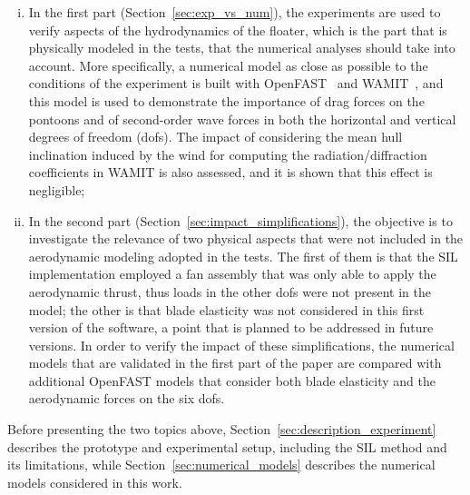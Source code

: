 \begin{enumerate}[i.]
    \item In the first part (Section~\ref{sec:exp_vs_num}), the experiments are used to verify aspects of the hydrodynamics of the floater, which is the part that is physically modeled in the tests, that the numerical analyses should take into account. More specifically, a numerical model as close as possible to the conditions of the experiment is built with OpenFAST~\citep{jonkman2005fast} and WAMIT~\citep{wamitManual}, and this model is used to demonstrate the importance of drag forces on the pontoons and of second-order wave forces in both the horizontal and vertical degrees of freedom (dofs). The impact of considering the mean hull inclination induced by the wind for computing the radiation/diffraction coefficients in WAMIT is also assessed, and it is shown that this effect is negligible;    
    \item In the second part (Section~\ref{sec:impact_simplifications}), the objective is to investigate the relevance of two physical aspects that were not included in the aerodynamic modeling adopted in the tests. The first of them is that the SIL implementation employed a fan assembly that was only able to apply the aerodynamic thrust, thus loads in the other dofs were not present in the model; the other is that blade elasticity was not considered in this first version of the software, a point that is planned to be addressed in future versions. In order to verify the impact of these simplifications, the numerical models that are validated in the first part of the paper are compared with additional OpenFAST models that consider both blade elasticity and the aerodynamic forces on the six dofs.
\end{enumerate}

Before presenting the two topics above, Section~\ref{sec:description_experiment} describes the prototype and experimental setup, including the SIL method and its limitations, while Section~\ref{sec:numerical_models} describes the numerical models considered in this work. 
